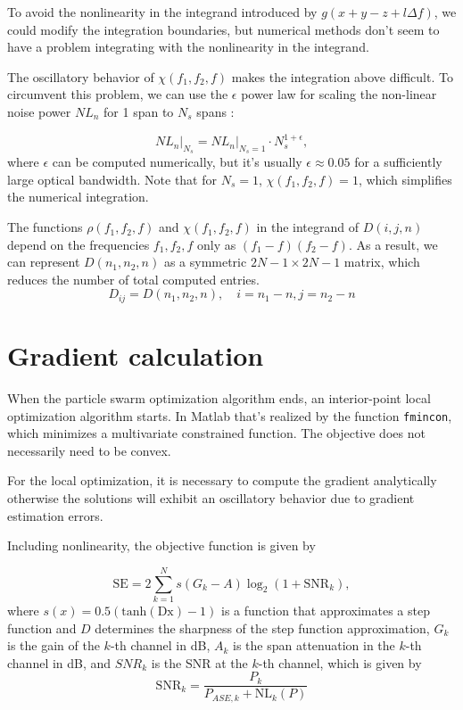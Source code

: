 \documentclass[a4paper]{article}
\begin{document}
To avoid the nonlinearity in the integrand introduced by $g(x+y-z+l\Delta f)$, we could modify the integration boundaries, but numerical methods don't seem to have a problem integrating with the nonlinearity in the integrand.

The oscillatory behavior of $\chi(f_1, f_2, f)$ makes the integration above difficult. To circumvent this problem, we can use the $\epsilon$ power law for scaling the non-linear noise power $NL_n$ for 1 span to $N_s$ spans \cite{Poggiolini2012}:

\begin{equation}
	NL_n\Big|_{N_s} = NL_n\Big|_{N_s = 1}\cdot N_s^{1+\epsilon},
\end{equation}
where $\epsilon$ can be computed numerically, but it's usually $\epsilon \approx 0.05$ for a sufficiently large optical bandwidth. Note that for $N_s = 1$, $\chi(f_1, f_2, f) = 1$, which simplifies the numerical integration.
 
The functions $\rho(f_1, f_2, f)$ and $\chi(f_1, f_2, f)$ in the integrand of $D(i, j, n)$ depend on the frequencies $f_1, f_2, f$ only as $(f_1-f)(f_2-f)$. As a result, we can represent $D(n_1, n_2, n)$ as a symmetric $2N-1\times 2N-1$ matrix, which reduces the number of total computed entries.
\begin{equation}
	D_{ij} = D(n_1, n_2, n), \quad i = n_1 - n, j = n_2 - n
\end{equation}

\section{Gradient calculation}

When the particle swarm optimization algorithm ends, an interior-point local optimization algorithm starts. In Matlab that's realized by the function \texttt{fmincon}, which minimizes a multivariate constrained function. The objective does not necessarily need to be convex.

For the local optimization, it is necessary to compute the gradient analytically otherwise the solutions will exhibit an oscillatory behavior due to gradient estimation errors.

Including nonlinearity, the objective function is given by

\begin{equation} \label{eq:grad:SE}
	\mathrm{SE} = 2\sum_{k = 1}^N s(G_k - A)\log_2(1 +  \mathrm{SNR}_k),
\end{equation}
where $s(x) = 0.5(\mathrm{tanh(Dx)}-1)$ is a function that approximates a step function and $D$ determines the sharpness of the step function approximation, $G_k$ is the gain of the $k$-th channel in dB, $A_k$ is the span attenuation in the $k$-th channel in dB, and $SNR_k$ is the SNR at the $k$-th channel, which is given by
\begin{equation}
	\mathrm{SNR}_k = \frac{P_k}{P_{ASE, k} + \mathrm{NL}_k(P)}
\end{equation}
\end{document}
